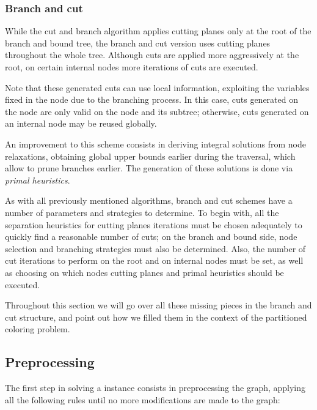 \subsubsection{Branch and cut}

While the cut and branch algorithm applies cutting planes only at the root of the branch and bound tree, the branch and cut version uses cutting planes throughout the whole tree. Although cuts are applied more aggressively at the root, on certain internal nodes more iterations of cuts are executed. 

Note that these generated cuts can use local information, exploiting the variables fixed in the node due to the branching process. In this case, cuts generated on the node are only valid on the node and its subtree; otherwise, cuts generated on an internal node may be reused globally.

An improvement to this scheme consists in deriving integral solutions from node relaxations, obtaining global upper bounds earlier during the traversal, which allow to prune branches earlier. The generation of these solutions is done via \textit{primal heuristics}.

As with all previously mentioned algorithms, branch and cut schemes have a number of parameters and strategies to determine. To begin with, all the separation heuristics for cutting planes iterations must be chosen adequately to quickly find a reasonable number of cuts; on the branch and bound side, node selection and branching strategies must also be determined. Also, the number of cut iterations to perform on the root and on internal nodes must be set, as well as choosing on which nodes cutting planes and primal heuristics should be executed.

Throughout this section we will go over all these missing pieces in the branch and cut structure, and point out how we filled them in the context of the partitioned coloring problem.

\subsection{Preprocessing}

The first step in solving a \PCP{} instance consists in preprocessing the graph, applying all the following rules until no more modifications are made to the graph:

